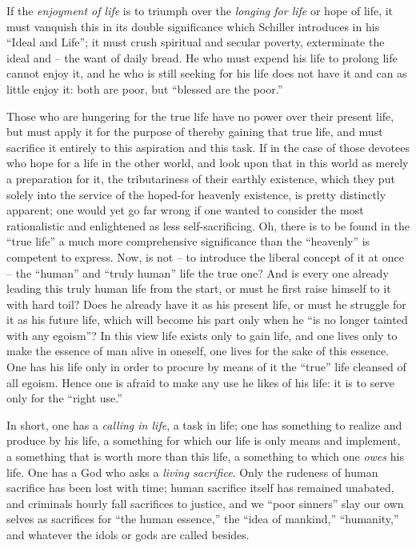 \documentclass[12pt,a4paper]{book}
\begin{document}
If the \textit{enjoyment of life} is to triumph over the \textit{longing for 
life} or hope of life, it must vanquish this in its double significance which 
Schiller introduces in his ``Ideal and Life''; it must crush spiritual and 
secular poverty, exterminate the ideal and -- the want of daily bread. He who 
must expend his life to prolong life cannot enjoy it, and he who is still 
seeking for his life does not have it and can as little enjoy it: both are 
poor, but ``blessed are the poor.''

Those who are hungering for the true life have no power over their present 
life, but must apply it for the purpose of thereby gaining that true life, and 
must sacrifice it entirely to this aspiration and this task. If in the case of 
those devotees who hope for a life in the other world, and look upon that in 
this world as merely a preparation for it, the tributariness of their earthly 
existence, which they put solely into the service of the hoped-for heavenly 
existence, is pretty distinctly apparent; one would yet go far wrong if one 
wanted to consider the most rationalistic and enlightened as less 
self-sacrificing. Oh, there is to be found in the ``true life'' a much more 
comprehensive significance than the ``heavenly'' is competent to express. 
Now, is not -- to introduce the liberal concept of it at once -- the 
``human'' and ``truly human'' life the true one? And is every one already 
leading this truly human life from the start, or must he first raise himself 
to it with hard toil? Does he already have it as his present life, or must he 
struggle for it as his future life, which will become his part only when he 
``is no longer tainted with any egoism''? In this view life exists only to 
gain life, and one lives only to make the essence of man alive in oneself, one 
lives for the sake of this essence. One has his life only in order to procure 
by means of it the ``true'' life cleansed of all egoism. Hence one is afraid 
to make any use he likes of his life: it is to serve only for the ``right 
use.''

In short, one has a \textit{calling in life}, a task in life; one has 
something to realize and produce by his life, a something for which our life 
is only means and implement, a something that is worth more than this life, a 
something to which one \textit{owes} his life. One has a God who asks a 
\textit{living sacrifice}. Only the rudeness of human sacrifice has been lost 
with time; human sacrifice itself has remained unabated, and criminals hourly 
fall sacrifices to justice, and we ``poor sinners'' slay our own selves as 
sacrifices for ``the human essence,'' the ``idea of mankind,'' 
``humanity,'' and whatever the idols or gods are called besides.
\end{document}
